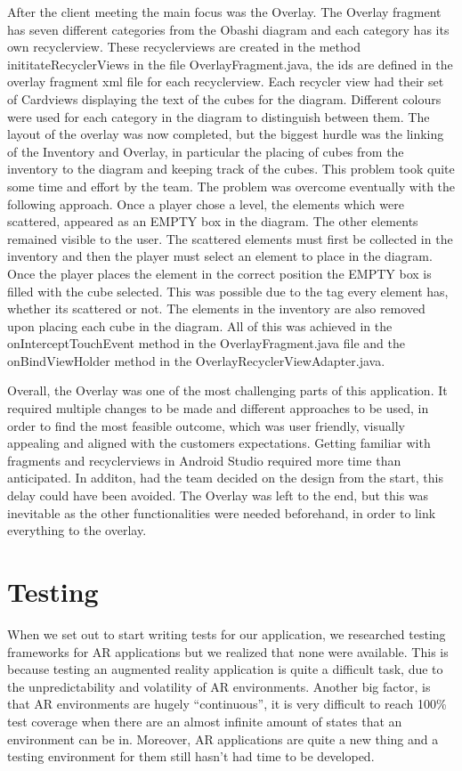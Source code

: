 \documentclass{l3proj}
\begin{document}
After the client meeting the main focus was the Overlay. The Overlay fragment has seven different 
categories from the Obashi diagram and each category has its own recyclerview\cite{Recyclerviews}. 
These recyclerviews are created in the method inititateRecyclerViews in the file OverlayFragment.java, 
the ids\cite{ID's} are defined in the overlay fragment xml file for each recyclerview. Each recycler 
view had their set of Cardviews displaying the text of the cubes for the diagram. Different colours 
were used for each category in the diagram to distinguish between them. The layout of the overlay was 
now completed, but the biggest hurdle was the linking of the Inventory and Overlay, in particular the 
placing of cubes from the inventory to the diagram and keeping track of the cubes. This problem took 
quite some time and effort by the team. The problem was overcome eventually with the following 
approach. Once a player chose a level, the elements which were scattered, appeared as an EMPTY box in 
the diagram. The other elements remained visible to the user. The scattered elements must first be 
collected in the inventory and then the player must select an element to place in the diagram. 
Once the player places the element in the correct position the EMPTY box is filled with the cube 
selected. This was possible due to the tag\cite{Tags} every element has, whether its scattered or not. 
The elements in the inventory are also removed upon placing each cube in the diagram. All of this was 
achieved in the onInterceptTouchEvent method in the OverlayFragment.java file and the onBindViewHolder 
method in the OverlayRecyclerViewAdapter.java.

Overall, the Overlay was one of the most challenging parts of this application. It required
multiple changes to be made and different approaches to be used, in order to find the most
feasible outcome, which was user friendly, visually appealing and aligned with the customers 
expectations. Getting familiar with fragments and recyclerviews in Android Studio required 
more time than anticipated. In additon, had the team decided on the design from the start, 
this delay could have been avoided. The Overlay was left to the end, but this was inevitable 
as the other functionalities were needed beforehand, in order to link everything to the overlay. 
 


\section{Testing}
When we set out to start writing tests for our application, we researched testing 
frameworks for AR applications but we realized that none were available.
This is because testing an augmented reality application is quite a difficult task, 
due to the unpredictability and volatility of AR environments. 
Another big factor, is that AR environments are hugely “continuous”, it is 
very difficult to reach 100\% test coverage when there are an almost infinite 
amount of states that an environment can be in. Moreover, AR applications are
quite a new thing and a testing environment for them still hasn't had time to
be developed\cite{ArTesting}.
\end{document}
